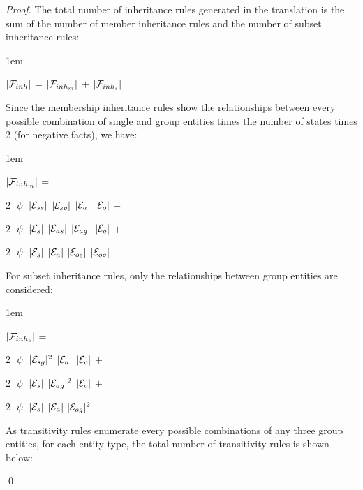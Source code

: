 \documentclass[global,twocolumn,final]{svjour}
\newenvironment{vproof}
  {\begin{proof}\hspace{0.25em}}
  {\qed\end{proof}}
\newenvironment{vquote}
  {\begin{list}{}{\leftmargin 1em}\item[]}
  {\end{list}}
\begin{document}
\begin{vproof}
          The total number of inheritance rules generated in the translation is
          the sum of the number of member inheritance rules and the number of
          subset inheritance rules:

          \begin{vquote}
            $|{\cal F}_{inh}|$ =
            $|{\cal F}_{inh_{m}}|$ $+$
            $|{\cal F}_{inh_{s}}|$
          \end{vquote}

          Since the membership inheritance rules show the relationships between
          every possible combination of single and group entities times the
          number of states times 2 (for negative facts), we have:

          \begin{vquote}
            $|{\cal F}_{inh_{m}}|$ =

            \hspace{1em}
            $2$ $|\psi|$ $|{\cal E}_{ss}|$ $|{\cal E}_{sg}|$ $|{\cal E}_{a}|$ $|{\cal E}_{o}|$ $+$

            \hspace{1em}
            $2$ $|\psi|$ $|{\cal E}_{s}|$ $|{\cal E}_{as}|$ $|{\cal E}_{ag}|$ $|{\cal E}_{o}|$ $+$

            \hspace{1em}
            $2$ $|\psi|$ $|{\cal E}_{s}|$ $|{\cal E}_{a}|$ $|{\cal E}_{os}|$ $|{\cal E}_{og}|$
          \end{vquote}

          For subset inheritance rules, only the relationships between group
          entities are considered:

          \begin{vquote}
            $|{\cal F}_{inh_{s}}|$ =

            \hspace{1em}
            $2$ $|\psi|$ $|{\cal E}_{sg}|^{2}$ $|{\cal E}_{a}|$ $|{\cal E}_{o}|$ $+$

            \hspace{1em}
            $2$ $|\psi|$ $|{\cal E}_{s}|$ $|{\cal E}_{ag}|^{2}$ $|{\cal E}_{o}|$ $+$

            \hspace{1em}
            $2$ $|\psi|$ $|{\cal E}_{s}|$ $|{\cal E}_{a}|$ $|{\cal E}_{og}|^{2}$
          \end{vquote}

          As transitivity rules enumerate every possible combinations of any
          three group entities, for each entity type, the total number of
          transitivity rules is shown below:


\end{vproof}
\end{document}

